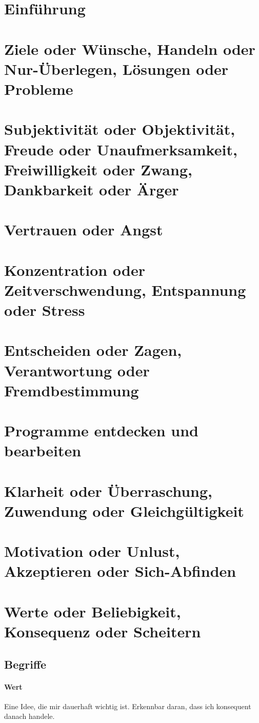 %
%
%
\section{Einführung}
%
%
%
\section{Ziele oder Wünsche, Handeln oder Nur-Überlegen, Lösungen oder Probleme}
%
%
%
\section{Subjektivität oder Objektivität, Freude oder Unaufmerksamkeit, Freiwilligkeit oder Zwang, Dankbarkeit oder Ärger}
%
%
%
\section{Vertrauen oder Angst}
%
%
%
\section{Konzentration oder Zeitverschwendung, Entspannung oder Stress}
%
%
%
\section{Entscheiden oder Zagen, Verantwortung oder Fremdbestimmung}
%
%
%
\section{Programme entdecken und bearbeiten}
%
%
%
\section{Klarheit oder Überraschung, Zuwendung oder Gleichgültigkeit}
%
%
%
\section{Motivation oder Unlust, Akzeptieren oder Sich-Abfinden}
%
%
%
\section{Werte oder Beliebigkeit, Konsequenz oder Scheitern}

\subsection{Begriffe}

\paragraph{Wert} Eine Idee, die mir dauerhaft wichtig ist.
Erkennbar daran, dass ich konsequent danach handele.

